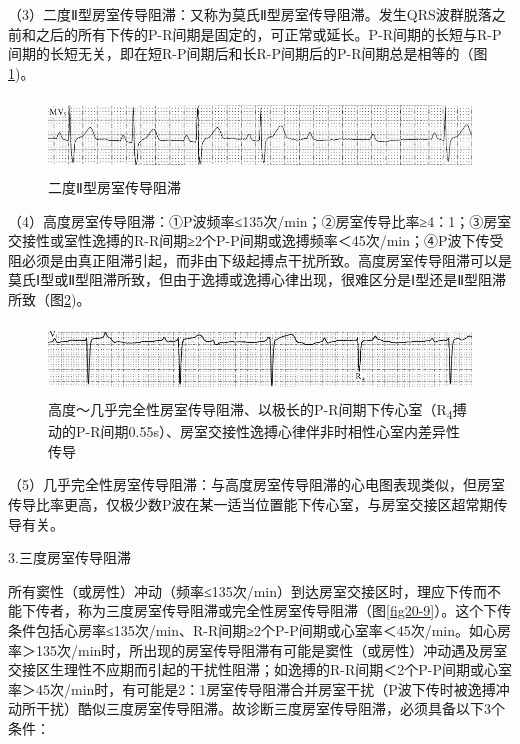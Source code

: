 （3）二度Ⅱ型房室传导阻滞：又称为莫氏Ⅱ型房室传导阻滞。发生QRS波群脱落之前和之后的所有下传的P-R间期是固定的，可正常或延长。P-R间期的长短与R-P间期的长短无关，即在短R-P间期后和长R-P间期后的P-R间期总是相等的（图\ref{fig20-7})。

\begin{figure}[!htbp]
 \centering
 \includegraphics[width=5.58333in,height=0.79167in]{./images/Image00336.jpg}
 \captionsetup{justification=centering}
 \caption{二度Ⅱ型房室传导阻滞}
 \label{fig20-7}
  \end{figure} 

（4）高度房室传导阻滞：①P波频率≤135次/min；②房室传导比率≥4：1；③房室交接性或室性逸搏的R-R间期≥2个P-P间期或逸搏频率＜45次/min；④P波下传受阻必须是由真正阻滞引起，而非由下级起搏点干扰所致。高度房室传导阻滞可以是莫氏Ⅰ型或Ⅱ型阻滞所致，但由于逸搏或逸搏心律出现，很难区分是Ⅰ型还是Ⅱ型阻滞所致（图\ref{fig20-8})。

\begin{figure}[!htbp]
 \centering
 \includegraphics[width=5.58333in,height=0.75in]{./images/Image00337.jpg}
 \captionsetup{justification=centering}
 \caption{高度～几乎完全性房室传导阻滞、以极长的P-R间期下传心室（R\textsubscript{4}搏动的P-R间期0.55s）、房室交接性逸搏心律伴非时相性心室内差异性传导}
 \label{fig20-8}
  \end{figure} 


（5）几乎完全性房室传导阻滞：与高度房室传导阻滞的心电图表现类似，但房室传导比率更高，仅极少数P波在某一适当位置能下传心室，与房室交接区超常期传导有关。

3.三度房室传导阻滞

所有窦性（或房性）冲动（频率≤135次/min）到达房室交接区时，理应下传而不能下传者，称为三度房室传导阻滞或完全性房室传导阻滞（图\ref{fig20-9}）。这个下传条件包括心房率≤135次/min、R-R间期≥2个P-P间期或心室率＜45次/min。如心房率＞135次/min时，所出现的房室传导阻滞有可能是窦性（或房性）冲动遇及房室交接区生理性不应期而引起的干扰性阻滞；如逸搏的R-R间期＜2个P-P间期或心室率＞45次/min时，有可能是2：1房室传导阻滞合并房室干扰（P波下传时被逸搏冲动所干扰）酷似三度房室传导阻滞。故诊断三度房室传导阻滞，必须具备以下3个条件：

